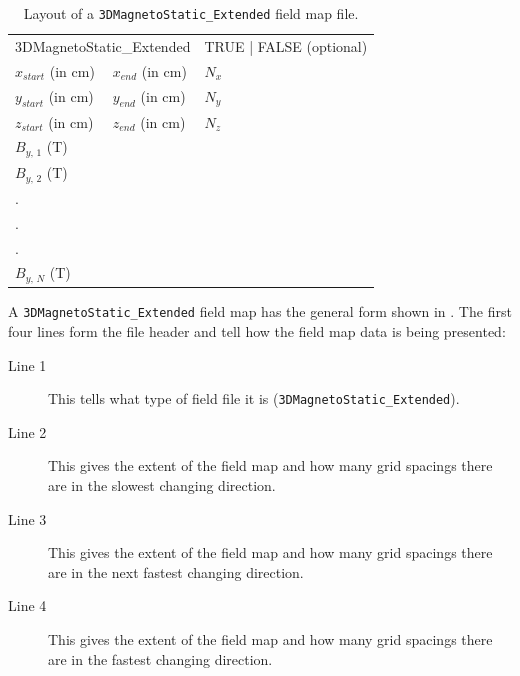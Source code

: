 \begin{table}[ht!]
    \caption{Layout of a \texttt{3DMagnetoStatic\_Extended} field map file.}
    \label{tab:3DMagnetoStatic_Extended}
    \begin{center}
    \begin{tabular}{lll}
      \hline
      \multicolumn{2}{l}{3DMagnetoStatic\_Extended}  &  TRUE | FALSE (optional)  \\
      $x_{start}$ (in cm)       & $x_{end}$ (in cm)  & $N_{x}$   \\
      $y_{start}$ (in cm)       & $y_{end}$ (in cm)  & $N_{y}$   \\
      $z_{start}$ (in cm)       & $z_{end}$ (in cm)  & $N_{z}$   \\
      $B_{y,\,1}$ (T)           &                    &           \\
      $B_{y,\,2}$ (T)           &                    &           \\
      .                         &                    &           \\
      .                         &                    &           \\
      .                         &                    &           \\
      $B_{y,\,N}$ (T)           &                    &           \\
      \hline
    \end{tabular}
    \end{center}
\end{table}

A \texttt{3DMagnetoStatic\_Extended} field map has the general form shown in . The first four lines form the file header and tell \opalt how the field map data is being presented:

\begin{description}
\item[Line 1] This tells \opalt what type of field file it is (\texttt{3DMagnetoStatic\_Extended}).
\item[Line 2] This gives the extent of the field map and how many grid spacings there are in the slowest changing direction.
\item[Line 3] This gives the extent of the field map and how many grid spacings there are in the next fastest changing direction.
\item[Line 4] This gives the extent of the field map and how many grid spacings there are in the fastest changing direction.
\end{description}

